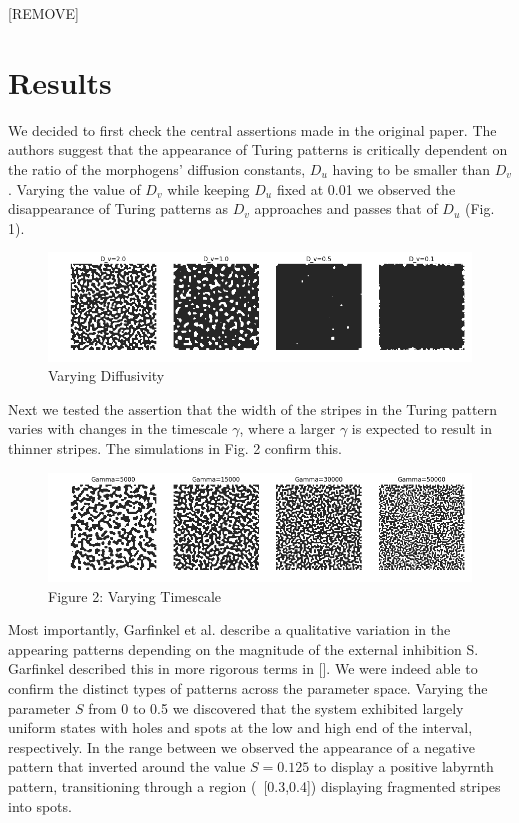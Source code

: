 \documentclass[12pt]{article}
\begin{document}
[REMOVE]

\pagebreak

\section{Results}

We decided to first check the central assertions made in the original paper. The authors suggest that the appearance of Turing patterns is critically dependent on the ratio of the morphogens' diffusion constants, $D_u$ having to be smaller than $D_v$. Varying the value of $D_v$ while keeping $D_u$ fixed at 0.01 we observed the disappearance of Turing patterns as $D_v$ approaches and passes that of $D_u$ (Fig. 1).

\begin{figure}[H]
  \includegraphics[width=\linewidth]{diffusivity.png}
  \caption{Varying Diffusivity}
  \label{fig:dv}
\end{figure}

Next we tested the assertion that the width of the stripes in the Turing pattern varies with changes in the timescale $\gamma$, where a larger $\gamma$ is expected to result in thinner stripes. The simulations in Fig. 2 confirm this.

\begin{figure}[H]
  \includegraphics[width=\linewidth]{timescale.png}
  \caption{Figure 2: Varying Timescale}
  \label{fig:gamma}
\end{figure}

Most importantly, Garfinkel et al. describe a qualitative variation in the appearing patterns depending on the magnitude of the external inhibition S. Garfinkel described this in more rigorous terms in []. We were indeed able to confirm the distinct types of patterns across the parameter space. Varying the parameter $S$ from 0 to 0.5 we discovered that the system exhibited largely uniform states with holes and spots at the low and high end of the interval, respectively. In the range between we observed the appearance of a negative pattern that inverted around the value $S=0.125$ to display a positive labyrnth pattern, transitioning through a region (~[0.3,0.4]) displaying fragmented stripes into spots.
\end{document}
